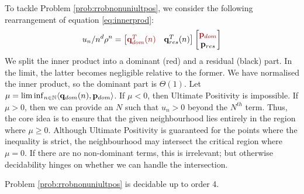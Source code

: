 To tackle Problem \ref{prob:rrobnonuniultpos}, we consider the following rearrangement of equation \ref{eq:innerprod}:
\begin{equation}
\label{eq:grouping}
u_n/n^d\rho^n = \begin{bmatrix}
{\color{red!70!black} \mathbf{q}_{dom}^T(n) } & \mathbf{q}_{res}^T(n)
\end{bmatrix}
\begin{bmatrix}
{\color{red!70!black} \mathbf{p}_{dom}} \\
\mathbf{p}_{res}
\end{bmatrix}
\end{equation}
We split the inner product into a dominant ({\color{red!70!black}red}) and a residual (black) part. In the limit, the latter becomes negligible relative to the former. We have normalised the inner product, so the dominant part is $\Theta(1)$. Let $\mu = \liminf_{n\in \mathbb{N}}\langle \mathbf{q}_{dom}(n), \mathbf{p}_{dom}\rangle$. If $\mu < 0$, then Ultimate Positivity is impossible. If $\mu > 0$, then we can provide an $N$ such that $u_n > 0$ beyond the $N^{th}$ term. Thus, the core idea is to ensure that the given neighbourhood lies entirely in the region where $\mu \ge 0$. Although Ultimate Positivity is guaranteed for the points where the inequality is strict, the neighbourhood may intersect the critical region where $\mu = 0$. If there are no non-dominant terms, this is irrelevant; but otherwise decidability hinges on whether we can handle the intersection.
\begin{theorem}
\label{thm:decide2}
Problem \ref{prob:rrobnonuniultpos} is decidable up to order 4.
\end{theorem}




